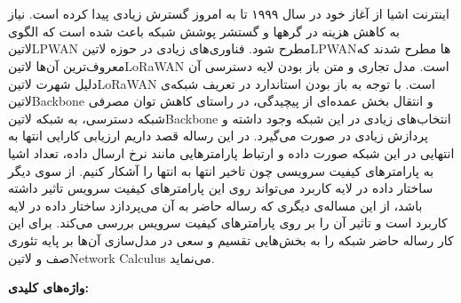 \newpage\clearpage

\pagestyle{abstract}

\vspace*{-1cm}
\section*{\centering \abstractname}
\vspace*{.5cm}

اینترنت اشیا از آغاز خود در سال ۱۹۹۹ تا به امروز گسترش زیادی پیدا کرده است.
نیاز به کاهش هزینه در گرهها و گستشر پوشش شبکه باعث شده است که الگوی ‌لاتین{LPWAN} مطرح شود.
فناوری‌های زیادی در حوزه ‌لاتین{LPWAN}ها مطرح شدند که معروف‌ترین آن‌ها ‌لاتین{LoRaWAN} است. مدل تجاری و متن باز بودن
لایه دسترسی آن دلیل شهرت ‌لاتین{LoRaWAN} است.
با توجه به باز بودن استاندارد در تعریف شبکه‌ی ‌لاتین{Backbone} و انتقال بخش عمده‌ای از پیچیدگی، در راستای کاهش توان مصرفی
شبکه دسترسی، به شبکه ‌لاتین{Backbone} انتخاب‌های زیادی در این شبکه وجود داشته و پردازش زیادی در صورت می‌گیرد.
در این رساله قصد داریم ارزیابی کارایی انتها به انتهایی در این شبکه صورت داده و ارتباط پارامترهایی مانند نرخ ارسال داده، تعداد اشیا
به پارامترهای کیفیت سرویسی چون تاخیر انتها به انتها را آشکار کنیم.
از سوی دیگر ساختار داده در لایه کاربرد می‌تواند روی این پارامترهای کیفیت سرویس تاثیر داشته باشد، از این مساله‌ی دیگری که رساله حاضر به آن می‌پردازد
ساختار داده در لایه کاربرد است و تاثیر آن را بر روی پارامترهای کیفیت سرویس بررسی می‌کند.
برای این کار رساله حاضر شبکه را به بخش‌هایی تقسیم و سعی در مدل‌سازی آن‌ها بر پایه تئوری صف و ‌لاتین{Network Calculus}
می‌نماید.


\vspace*{2cm}

{%
  \noindent\large\textbf{واژه‌های کلیدی:}
}\par
\vspace*{.5cm}
